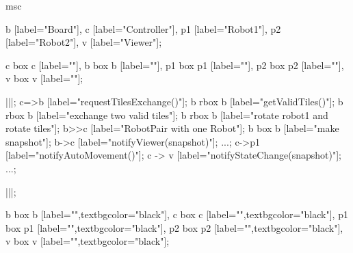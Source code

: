 \begin{msc}
msc
{

b [label="Board"],
c [label="Controller"],
p1 [label="Robot1"],
p2 [label="Robot2"],
v [label="Viewer"];

c box c [label=""],
b box b [label=""],
p1 box p1 [label=""],
p2 box p2 [label=""],
v box v [label=""];

|||;
c=>b [label="requestTilesExchange()"];
b rbox b [label="getValidTiles()"];
b rbox b [label="exchange two valid tiles"];
b rbox b [label="rotate robot1 and rotate tiles"];
b>>c [label="RobotPair with one Robot"];
b box b [label="make snapshot"];
b->c [label="notifyViewer(snapshot)"];
...;
c->p1 [label="notifyAutoMovement()"];
c -> v [label="notifyStateChange(snapshot)"];
...;

|||;

b box b [label="",textbgcolor="black"],
c box c [label="",textbgcolor="black"],
p1 box p1 [label="",textbgcolor="black"],
p2 box p2 [label="",textbgcolor="black"],
v box v [label="",textbgcolor="black"];

}
\end{msc}

